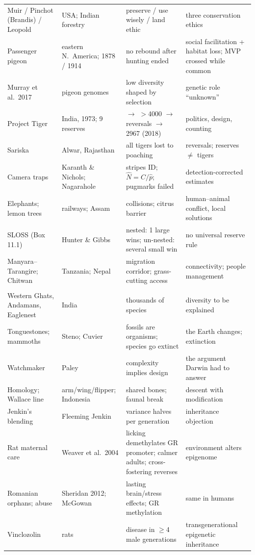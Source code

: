 {\begin{longtable}{>{\raggedright\arraybackslash}p{}>{\raggedright\arraybackslash}p{}>{\raggedright\arraybackslash}p{}>{\raggedright\arraybackslash}p{}}
Muir / Pinchot (Brandis) / Leopold & USA; Indian forestry & preserve / use wisely / land ethic & three conservation ethics\\
Passenger pigeon & eastern N.\ America; 1878 / 1914 & no rebound after hunting ended & social facilitation + habitat loss; MVP crossed while common\\
Murray et al.\ 2017 & pigeon genomes & low diversity shaped by selection & genetic role ``unknown''\\
Project Tiger & India, 1973; 9 reserves & 1827 $\to$ $>$4000 $\to$ reversals $\to$ 2967 (2018) & politics, design, counting\\
Sariska & Alwar, Rajasthan & all tigers lost to poaching & reversals; reserves $\neq$ tigers\\
Camera traps & Karanth \& Nichols; Nagarahole & stripes ID; $\hat N=C/\hat p$; pugmarks failed & detection-corrected estimates\\
Elephants; lemon trees & railways; Assam & collisions; citrus barrier & human--animal conflict, local solutions\\
SLOSS (Box 11.1) & Hunter \& Gibbs & nested: 1 large wins; un-nested: several small win & no universal reserve rule\\
Manyara--Tarangire; Chitwan & Tanzania; Nepal & migration corridor; grass-cutting access & connectivity; people management\\
\midrule
\multicolumn{4}{l}{\textbf{EE08 Evolution}}\\
Western Ghats, Andamans, Eaglenest & India & thousands of species & diversity to be explained\\
Tonguestones; mammoths & Steno; Cuvier & fossils are organisms; species go extinct & the Earth changes; extinction\\
Watchmaker & Paley & complexity implies design & the argument Darwin had to answer\\
Homology; Wallace line & arm/wing/flipper; Indonesia & shared bones; faunal break & descent with modification\\
Jenkin's blending & Fleeming Jenkin & variance halves per generation & inheritance objection\\
Rat maternal care & Weaver et al.\ 2004 & licking demethylates GR promoter; calmer adults; cross-fostering reverses & environment alters epigenome\\
Romanian orphans; abuse & Sheridan 2012; McGowan & lasting brain/stress effects; GR methylation & same in humans\\
Vinclozolin & rats & disease in $\ge$4 male generations & transgenerational epigenetic inheritance\\

\end{longtable}}
